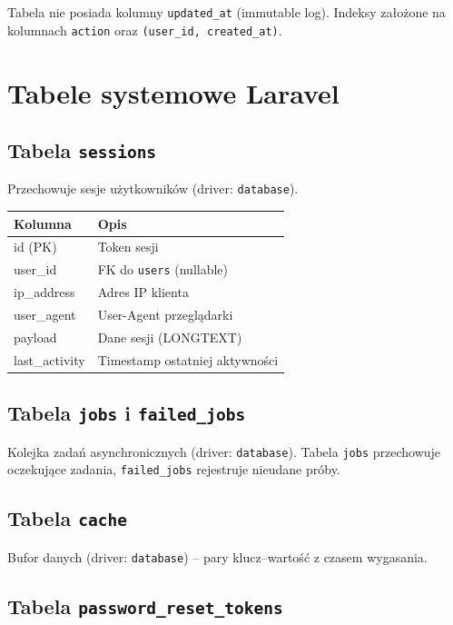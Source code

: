 \documentclass[12pt,a4paper]{report}
\begin{document}
Tabela nie posiada kolumny \texttt{updated\_at} (immutable log). Indeksy założone na kolumnach \texttt{action} oraz \texttt{(user\_id, created\_at)}.

\section{Tabele systemowe Laravel}

\subsection{Tabela \texttt{sessions}}

Przechowuje sesje użytkowników (driver: \texttt{database}).

\begin{center}
\begin{tabular}{|l|l|}
\hline
\textbf{Kolumna}  & \textbf{Opis}               \\
\hline
id (PK)           & Token sesji                 \\
user\_id          & FK do \texttt{users} (nullable) \\
ip\_address       & Adres IP klienta            \\
user\_agent       & User-Agent przeglądarki     \\
payload           & Dane sesji (LONGTEXT)       \\
last\_activity    & Timestamp ostatniej aktywności \\
\hline
\end{tabular}
\end{center}

\subsection{Tabela \texttt{jobs} i \texttt{failed\_jobs}}

Kolejka zadań asynchronicznych (driver: \texttt{database}). Tabela \texttt{jobs} przechowuje oczekujące zadania, \texttt{failed\_jobs} rejestruje nieudane próby.

\subsection{Tabela \texttt{cache}}

Bufor danych (driver: \texttt{database}) -- pary klucz--wartość z czasem wygasania.

\subsection{Tabela \texttt{password\_reset\_tokens}}
\end{document}
